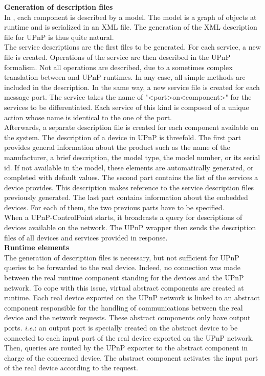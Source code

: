 {\bf Generation of description files}\\
In \enti{}, each component is described by a model. The model is a graph of objects at runtime and is serialized in an XML file. The generation of the XML description file for UPnP is thus quite natural.\\
The service descriptions are the first files to be generated. For each \enti{} service, a new file is created. Operations of the service are then described in the UPnP formalism. Not all operations are described, due to a sometimes complex translation between \enti{} and UPnP runtimes. In any case, all simple methods are included in the description. In the same way, a new service file is created for each message port. The service takes the name of "<port>on<component>" for the services to be differentiated. Each service of this kind is composed of a unique action whose name is identical to the one of the port.\\
Afterwards, a separate description file is created for each component available on the system. The description of a device in UPnP is threefold. The first part provides general information about the product such as the name of the manufacturer, a brief description, the model type, the model number, or its serial id. If not available in the model, these elements are automatically generated, or completed with default values. The second part contains the list of the services a device provides. This description makes reference to the service description files previously generated. The last part contains information about the embedded devices. For each of them, the two previous parts have to be specified.\\

When a UPnP-ControlPoint starts, it broadcasts a query for descriptions of devices available on the network. The UPnP wrapper then sends the description files of all devices and services provided in response.\\

{\bf Runtime elements}\\
The generation of description files is necessary, but not sufficient for UPnP queries to be forwarded to the real device. Indeed, no connection was made between the real runtime component standing for the devices and the UPnP network. To cope with this issue, virtual abstract \enti{} components are created at runtime. Each real device exported on the UPnP network is linked to an abstract component responsible for the handling of communications between the real device and the network requests. These abstract components only have output ports. {\it i.e.}: an output port is specially created on the abstract device to be connected to each input port of the real device exported on the UPnP network.\\
Then, queries are routed by the UPnP exporter to the abstract component in charge of the concerned device. The abstract component activates the input port of the real device according to the request.\\

